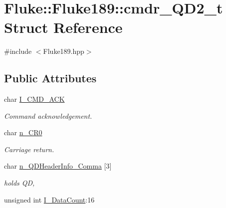 \hypertarget{structFluke_1_1Fluke189_1_1cmdr__QD2__t}{
\section{Fluke::Fluke189::cmdr\_\-QD2\_\-t Struct Reference}
\label{structFluke_1_1Fluke189_1_1cmdr__QD2__t}
}


{\ttfamily \#include $<$Fluke189.hpp$>$}\subsection*{Public Attributes}
\begin{DoxyCompactItemize}
\item 
\hypertarget{structFluke_1_1Fluke189_1_1cmdr__QD2__t_a8254c38cc41f017f9684d20065ef3950}{
char \hyperlink{structFluke_1_1Fluke189_1_1cmdr__QD2__t_a8254c38cc41f017f9684d20065ef3950}{I\_\-CMD\_\-ACK}}
\label{structFluke_1_1Fluke189_1_1cmdr__QD2__t_a8254c38cc41f017f9684d20065ef3950}

\begin{DoxyCompactList}\small\item\em Command acknowledgement. \item\end{DoxyCompactList}\item 
\hypertarget{structFluke_1_1Fluke189_1_1cmdr__QD2__t_ad57e0c44d7f2bcd7b1c5eddbadf10775}{
char \hyperlink{structFluke_1_1Fluke189_1_1cmdr__QD2__t_ad57e0c44d7f2bcd7b1c5eddbadf10775}{n\_\-CR0}}
\label{structFluke_1_1Fluke189_1_1cmdr__QD2__t_ad57e0c44d7f2bcd7b1c5eddbadf10775}

\begin{DoxyCompactList}\small\item\em Carriage return. \item\end{DoxyCompactList}\item 
\hypertarget{structFluke_1_1Fluke189_1_1cmdr__QD2__t_a4a897c2ffcd6985662f7756e7fd37ee4}{
char \hyperlink{structFluke_1_1Fluke189_1_1cmdr__QD2__t_a4a897c2ffcd6985662f7756e7fd37ee4}{n\_\-QDHeaderInfo\_\-Comma} \mbox{[}3\mbox{]}}
\label{structFluke_1_1Fluke189_1_1cmdr__QD2__t_a4a897c2ffcd6985662f7756e7fd37ee4}

\begin{DoxyCompactList}\small\item\em holds QD, \item\end{DoxyCompactList}\item 
\hypertarget{structFluke_1_1Fluke189_1_1cmdr__QD2__t_a445eb8eba3240c01c6d4de2c9d69fb68}{
unsigned int \hyperlink{structFluke_1_1Fluke189_1_1cmdr__QD2__t_a445eb8eba3240c01c6d4de2c9d69fb68}{I\_\-DataCount}:16}
\label{structFluke_1_1Fluke189_1_1cmdr__QD2__t_a445eb8eba3240c01c6d4de2c9d69fb68}


\end{DoxyCompactItemize}
